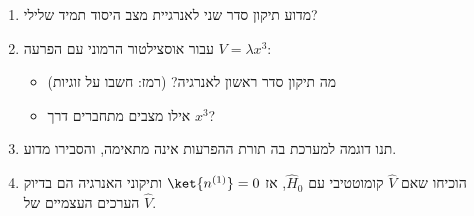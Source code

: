\begin{enumerate}
\item מדוע תיקון סדר שני לאנרגיית מצב היסוד תמיד שלילי?

\item עבור אוסצילטור הרמוני עם הפרעה $V = \lambda x^3$:
\begin{itemize}
\item מה תיקון סדר ראשון לאנרגיה? (רמז: חשבו על זוגיות)
\item אילו מצבים מתחברים דרך $x^3$?
\end{itemize}

\item תנו דוגמה למערכת בה תורת ההפרעות אינה מתאימה, והסבירו מדוע.

\item הוכיחו שאם $\hat{V}$ קומוטטיבי עם $\hat{H}_0$, אז $\ket{n^{(1)}} = 0$ ותיקוני האנרגיה הם בדיוק הערכים העצמיים של $\hat{V}$.
\end{enumerate}

